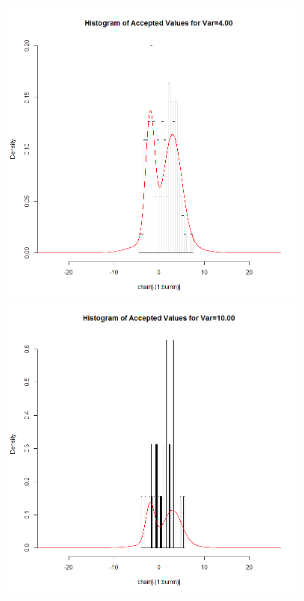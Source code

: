 \documentclass[12pt,letterpaper]{article}
\begin{document}
\begin{enumerate}[label={(\alph*) }]
        \includegraphics[width=3in]{3d_4.png} \includegraphics[width=3in]{3d_10.png} \\
   
   \end{enumerate}
\end{document}

